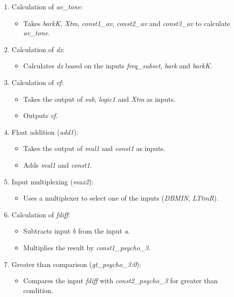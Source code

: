\begin{enumerate}

\item Calculation of \textit{av\_tone}:
\begin{itemize}
\item Takes \textit{barkK}, \textit{Xtm}, \textit{const1\_av}, \textit{const2\_av} and \textit{const3\_av} to calculate \textit{av\_tone}.
\end{itemize}

\item Calculation of \textit{dz}:
\begin{itemize}
\item Calculates \textit{dz} based on the inputs \textit{freq\_subset}, \textit{bark} and \textit{barkK}.
\end{itemize}

\item Calculation of \textit{vf}:
\begin{itemize}
\item Takes the output of \textit{sub}, \textit{logic1} and \textit{Xtm} as inputs.
\item Outputs \textit{vf}.
\end{itemize}

\item Float addition (\textit{add1}):
\begin{itemize}
\item Takes the output of \textit{mul1} and \textit{const1} as inputs.
\item Adds \textit{mul1} and \textit{const1}.
\end{itemize}

\item Input multiplexing (\textit{mux2}):
\begin{itemize}
\item Uses a multiplexer to select one of the inputs (\textit{DBMIN}, \textit{LTtmR}).
\end{itemize}

\item Calculation of \textit{fdiff}:
\begin{itemize}
\item Subtracts input \textit{b} from the input \textit{a}.
\item Multiplies the result by \textit{const1\_psycho\_3}.
\end{itemize}

\item Greater than comparison (\textit{gt\_psycho\_3:0}):
\begin{itemize}
\item Compares the input \textit{fdiff} with \textit{const2\_psycho\_3} for greater than condition.
\end{itemize}


\end{enumerate}
